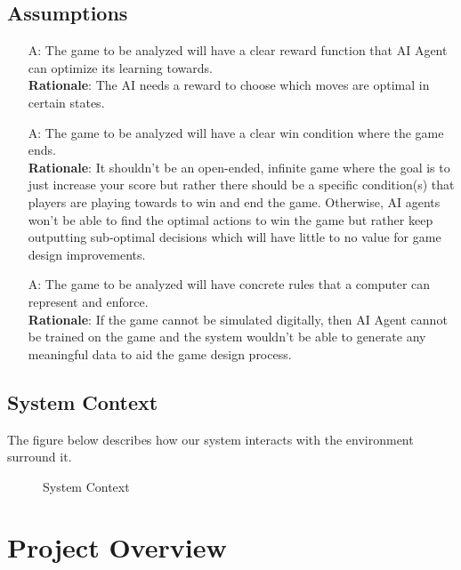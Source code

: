 \documentclass[12pt, titlepage]{article}
\newcounter{assumpnum}
\begin{document}
\subsection{Assumptions}
\begin{itemize}
\item[A\refstepcounter{assumpnum}\theassumpnum \label{A_Reward_Function}:]
  The game to be analyzed will have a clear reward function that AI Agent can optimize its learning towards. \\
  \textbf{Rationale}: The AI needs a reward to choose which moves are optimal in certain states.
  
  
\item[A\refstepcounter{assumpnum}\theassumpnum \label{A_End_Condition}:]
  The game to be analyzed will have a clear win condition where the game ends.\\ 
  \textbf{Rationale}: It shouldn't be an open-ended, infinite game where the goal is to just increase your score but rather there should be a specific condition(s) that players are playing towards to win and end the game. Otherwise, AI agents won't be able to find the optimal actions to win the game but rather keep outputting sub-optimal decisions which will have little to no value for game design improvements.
  
\item[A\refstepcounter{assumpnum}\theassumpnum \label{A_Representable}:]
  The game to be analyzed will have concrete rules that a computer can represent and enforce.\\
  \textbf{Rationale}: If the game cannot be simulated digitally, then AI Agent cannot be trained on the game and the system wouldn't be able to generate any meaningful data to aid the game design process.
\end{itemize}

\subsection{System Context}
The figure below describes how our system interacts with the environment surround it.
\begin{figure}[H]
\centering

\caption{System Context}
\label{FigSystemContext}
\end{figure}
\section{Project Overview}
\end{document}
